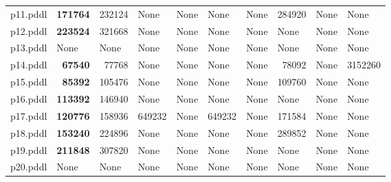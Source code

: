 \documentclass{article}
\begin{document}
\begin{tabular}{@{}lrrrrrrrrr@{}}
p11.pddl & \textbf{171764} & 232124 & \multicolumn{1}{|l|}{None} & \multicolumn{1}{|l|}{None} & \multicolumn{1}{|l|}{None} & \multicolumn{1}{|l|}{None} & 284920 & \multicolumn{1}{|l|}{None} & \multicolumn{1}{|l|}{None} \\
p12.pddl & \textbf{223524} & 321668 & \multicolumn{1}{|l|}{None} & \multicolumn{1}{|l|}{None} & \multicolumn{1}{|l|}{None} & \multicolumn{1}{|l|}{None} & \multicolumn{1}{|l|}{None} & \multicolumn{1}{|l|}{None} & \multicolumn{1}{|l|}{None} \\
p13.pddl & \multicolumn{1}{|l|}{None} & \multicolumn{1}{|l|}{None} & \multicolumn{1}{|l|}{None} & \multicolumn{1}{|l|}{None} & \multicolumn{1}{|l|}{None} & \multicolumn{1}{|l|}{None} & \multicolumn{1}{|l|}{None} & \multicolumn{1}{|l|}{None} & \multicolumn{1}{|l|}{None} \\
p14.pddl & \textbf{67540} & 77768 & \multicolumn{1}{|l|}{None} & \multicolumn{1}{|l|}{None} & \multicolumn{1}{|l|}{None} & \multicolumn{1}{|l|}{None} & 78092 & \multicolumn{1}{|l|}{None} & 3152260 \\
p15.pddl & \textbf{85392} & 105476 & \multicolumn{1}{|l|}{None} & \multicolumn{1}{|l|}{None} & \multicolumn{1}{|l|}{None} & \multicolumn{1}{|l|}{None} & 109760 & \multicolumn{1}{|l|}{None} & \multicolumn{1}{|l|}{None} \\
p16.pddl & \textbf{113392} & 146940 & \multicolumn{1}{|l|}{None} & \multicolumn{1}{|l|}{None} & \multicolumn{1}{|l|}{None} & \multicolumn{1}{|l|}{None} & \multicolumn{1}{|l|}{None} & \multicolumn{1}{|l|}{None} & \multicolumn{1}{|l|}{None} \\
p17.pddl & \textbf{120776} & 158936 & 649232 & \multicolumn{1}{|l|}{None} & 649232 & \multicolumn{1}{|l|}{None} & 171584 & \multicolumn{1}{|l|}{None} & \multicolumn{1}{|l|}{None} \\
p18.pddl & \textbf{153240} & 224896 & \multicolumn{1}{|l|}{None} & \multicolumn{1}{|l|}{None} & \multicolumn{1}{|l|}{None} & \multicolumn{1}{|l|}{None} & 289852 & \multicolumn{1}{|l|}{None} & \multicolumn{1}{|l|}{None} \\
p19.pddl & \textbf{211848} & 307820 & \multicolumn{1}{|l|}{None} & \multicolumn{1}{|l|}{None} & \multicolumn{1}{|l|}{None} & \multicolumn{1}{|l|}{None} & \multicolumn{1}{|l|}{None} & \multicolumn{1}{|l|}{None} & \multicolumn{1}{|l|}{None} \\
p20.pddl & \multicolumn{1}{|l|}{None} & \multicolumn{1}{|l|}{None} & \multicolumn{1}{|l|}{None} & \multicolumn{1}{|l|}{None} & \multicolumn{1}{|l|}{None} & \multicolumn{1}{|l|}{None} & \multicolumn{1}{|l|}{None} & \multicolumn{1}{|l|}{None} & \multicolumn{1}{|l|}{None} \\
\end{tabular}
\end{document}
